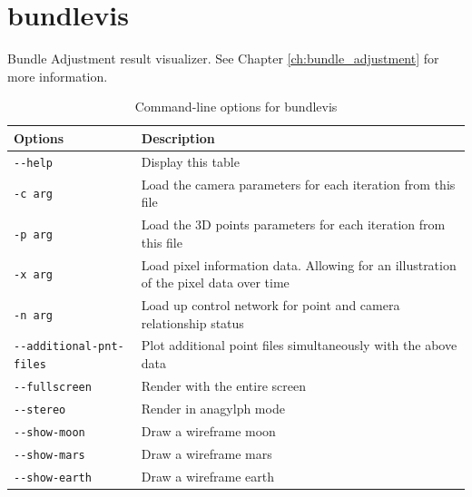 \section{bundlevis}
\label{bundlevis}

Bundle Adjustment result visualizer.  See Chapter
\ref{ch:bundle_adjustment} for more information.

\begin{longtable}{|l|p{10cm}|}
\caption{Command-line options for bundlevis}
\label{tbl:bundlevis}
\endfirsthead
\endhead
\endfoot
\endlastfoot
\hline
Options & Description \\ \hline \hline
\verb#--help# & Display this table \\ \hline
\verb#-c arg# & Load the camera parameters for each iteration from this file \\ \hline
\verb#-p arg# & Load the 3D points parameters for each iteration from this file \\ \hline
\verb#-x arg# & Load pixel information data. Allowing for an illustration of the pixel data over time \\ \hline
\verb#-n arg# & Load up control network for point and camera relationship status \\ \hline
\verb#--additional-pnt-files# & Plot additional point files simultaneously with the above data \\ \hline
\verb#--fullscreen# & Render with the entire screen \\ \hline
\verb#--stereo# & Render in anagylph mode \\ \hline
\verb#--show-moon# & Draw a wireframe moon \\ \hline
\verb#--show-mars# & Draw a wireframe mars \\ \hline
\verb#--show-earth# & Draw a wireframe earth \\ \hline
\end{longtable}









